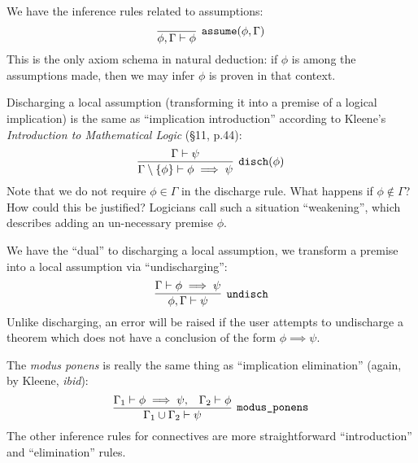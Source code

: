 \begin{node}
We have the inference rules related to assumptions:
\begin{equation}
\vcenter{\infer[\texttt{assume}(\phi,\Gamma)]{\phi,\Gamma\vdash\phi}{}}
\end{equation}
This is the only axiom schema in natural deduction: if $\phi$ is among
the assumptions made, then we may infer $\phi$ is proven in that context.

Discharging a local assumption (transforming it into a premise of a
logical implication) is the same as ``implication introduction'' according to
Kleene's \textit{Introduction to Mathematical Logic} (\S11, p.44):
\begin{equation}
\vcenter{\infer[\texttt{disch}(\phi)]{\Gamma\setminus\{\phi\}\vdash\phi\implies\psi}{\Gamma\vdash\psi}}
\end{equation}
Note that we do not require $\phi\in\Gamma$ in the discharge
rule. What happens if $\phi\notin\Gamma$? How could this be justified?
Logicians call such a situation ``weakening'', which describes adding
an un-necessary premise $\phi$.

We have the ``dual'' to discharging a local assumption, we transform a
premise into a local assumption via ``undischarging'':
\begin{equation}
\vcenter{\infer[\texttt{undisch}]{\phi,\Gamma\vdash\psi}{\Gamma\vdash\phi\implies\psi}}
\end{equation}
Unlike discharging, an error will be raised if the user attempts to
undischarge a theorem which does not have a conclusion of the form
$\phi\implies\psi$. 

The \textit{modus ponens} is really the same thing as ``implication elimination''
(again, by Kleene, \textit{ibid}):
\begin{equation}
\vcenter{\infer[\texttt{modus\_ponens}]{\Gamma_{1}\cup\Gamma_{2}\vdash\psi}{\Gamma_{1}\vdash\phi\implies\psi,&\Gamma_{2}\vdash\phi}}
\end{equation}
The other inference rules for connectives are more straightforward
``introduction'' and ``elimination'' rules.
\end{node}


